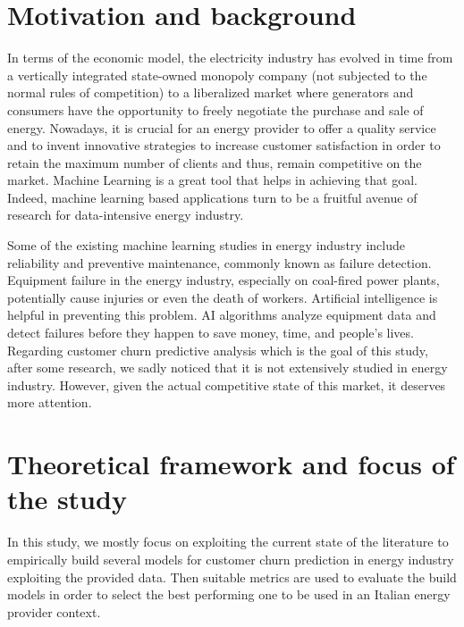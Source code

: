 \documentclass[LaM,binding=0.6cm, english]{sapthesis}
\begin{document}
\section{Motivation and background}

\par In terms of the economic model, the electricity industry has evolved in time from a vertically integrated state-owned monopoly company (not subjected to the normal rules of competition) to a liberalized market where generators and consumers have the opportunity to freely negotiate the purchase and sale of energy.\cite{Sousa2015} Nowadays, it is crucial for an energy provider to offer a quality service and to invent innovative strategies to increase customer satisfaction in order to retain the maximum number of clients and thus, remain competitive on the market. Machine Learning is a great tool that helps in achieving that goal. Indeed, machine learning based applications turn to be a fruitful avenue of research for data-intensive energy industry.

\par Some of the existing machine learning studies in energy industry include reliability and preventive maintenance, commonly known as failure detection.\cite{Garcia2016} Equipment failure in the energy industry, especially on coal-fired power plants, potentially cause injuries or even the death of workers. Artificial intelligence is helpful in preventing this problem. AI algorithms analyze equipment data and detect failures before they happen to save money, time, and people’s lives. Regarding customer churn predictive analysis which is the goal of this study, after some research, we sadly noticed that it is not extensively studied in energy industry. However, given the actual competitive state of this market, it deserves more attention.

\section{Theoretical framework and focus of the study}

In this study, we mostly focus on exploiting the current state of the literature to empirically build several models for customer churn prediction in energy industry exploiting the provided data. Then suitable metrics are used to evaluate the build models in order to select the best performing one to be used in an Italian energy provider context.
\end{document}
